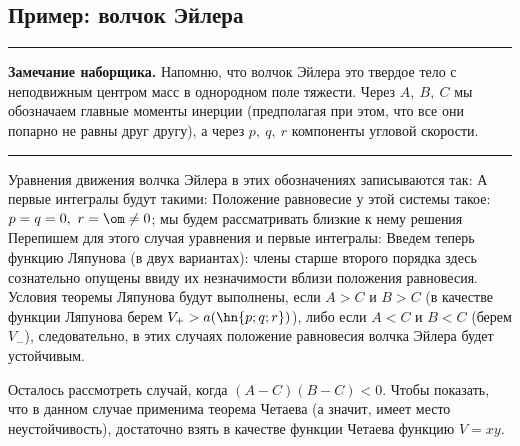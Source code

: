 \documentclass[a4paper,12pt]{article}
\newenvironment{nbb}{\par\vskip3pt\hrule\vskip3pt\textbf{\footnotesize Замечание наборщика.}\footnotesize }
{\vskip3pt\hrule\par\vskip3pt}
\begin{document}
\subsection{Пример: волчок Эйлера}

\begin{nbb}
Напомню, что волчок Эйлера это твердое тело с неподвижным центром масс в однородном поле
тяжести. Через $A,\ B,\ C$ мы обозначаем главные моменты инерции (предполагая при этом, что все они
попарно не равны друг другу), а через $p,\ q,\ r$ компоненты угловой скорости.
\end{nbb}
Уравнения движения волчка Эйлера в этих обозначениях записываются так:  А первые интегралы будут такими:  Положение равновесие у этой системы такое: $p=q=0,\ r=\om\neq0$; мы будем рассматривать близкие к
нему решения  Перепишем для этого случая уравнения и первые интегралы:
Введем теперь функцию Ляпунова (в двух вариантах):
члены старше второго порядка здесь сознательно опущены ввиду их незначимости вблизи положения
равновесия. Условия теоремы Ляпунова будут выполнены, если $A>C$ и $B>C$ (в качестве функции
Ляпунова берем $V_{+}>a(\hn{p;q;r})$), либо если $A<C$ и $B<C$ (берем $V_{-}$), следовательно, в
этих случаях положение равновесия волчка Эйлера будет устойчивым.

Осталось рассмотреть случай, когда $(A-C)(B-C)<0$. Чтобы показать, что в данном случае применима
теорема Четаева (а значит, имеет место неустойчивость), достаточно взять в качестве функции Четаева
функцию $V=xy$.
\end{document}
